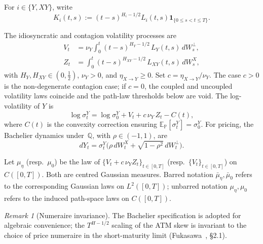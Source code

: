\documentclass[11pt,a4paper]{amsart}
\theoremstyle{plain}
\theoremstyle{definition}
\theoremstyle{remark}
\newtheorem{remark}[theorem]{Remark}
\newcommand{\Q}{\mathbb{Q}}
\newcommand{\PP}{\mathbb{P}}
\newcommand{\EE}{\mathbb{E}}
\begin{document}
For $i\in\{Y,XY\}$, write
\[
K_i(t,s):=(t-s)^{H_i-1/2}L_i(t,s)\mathbf 1_{\{0\le s<t\le T\}}.
\]

The idiosyncratic and contagion volatility processes are
\begin{align}
V_t &= \nu_Y \int_0^t (t-s)^{H_Y-1/2}\, L_Y(t,s)\, dW^\perp_s, \label{eq:V}\\
Z_t &= \int_0^t (t-s)^{H_{XY}-1/2}\, L_{XY}(t,s)\, dW^X_s, \label{eq:Z}
\end{align}
with $H_Y, H_{XY}\in(0,\tfrac12)$, $\nu_Y>0$, and $\eta_{X\to Y}\ge 0$. Set
$c = \eta_{X\to Y}/\nu_Y$. The case $c>0$ is the non-degenerate contagion case; if
$c=0$, the coupled and uncoupled volatility laws coincide and the path-law thresholds below are
void. The log-volatility of $Y$ is
\begin{equation}\label{eq:logsig}
\log\sigma^Y_t = \log\sigma^Y_0 + V_t + c\,\nu_Y\, Z_t - C(t),
\end{equation}
where $C(t)$ is the convexity correction ensuring $\EE_{\PP}[\sigma^Y_t]=\sigma^Y_0$.  For
pricing, the Bachelier dynamics under~$\Q$, with $\rho\in(-1,1)$, are
\begin{equation}\label{eq:price}
dY_t = \sigma^Y_t\bigl(\rho\, dW^X_t + \sqrt{1-\rho^2}\, dW^\perp_t\bigr).
\end{equation}

Let $\mu_\eta$ (resp.\ $\mu_0$) be the law of
$\{V_t + c\,\nu_Y Z_t\}_{t\in[0,T]}$ (resp.\ $\{V_t\}_{t\in[0,T]}$) on $C([0,T])$.  Both are
centred Gaussian measures.  Barred notation $\bar\mu_\eta,\bar\mu_0$ refers to the corresponding
Gaussian laws on $L^2([0,T])$; unbarred notation $\mu_\eta,\mu_0$ refers to the induced path-space
laws on $C([0,T])$.

\begin{remark}[Numeraire invariance]
The Bachelier specification is adopted for algebraic convenience; the $T^{H-1/2}$ scaling of the ATM skew is invariant to the choice of price numeraire in the short-maturity limit (Fukasawa~\cite{Fuk17}, \S2.1).
\end{remark}
\end{document}
